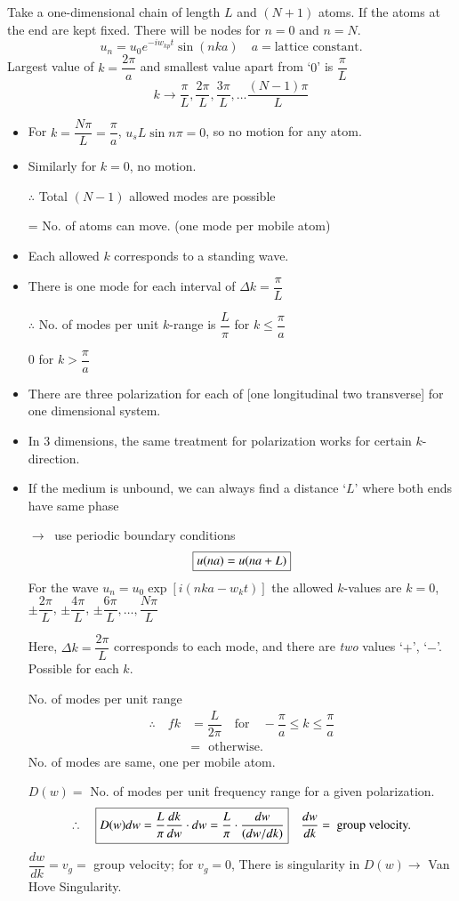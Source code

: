 Take a one-dimensional chain of length $L$ and $(N+1)$ atoms. If the atoms at the end are kept fixed. There will be nodes for $n=0$ and $n=N$.
$$
u_{n}=u_{0}e^{-iw_{kp}t}\sin (nka)\quad a= \text{lattice constant.}
$$
Largest value of $k=\dfrac{2\pi}{a}$ and smallest value apart from `$0$' is $\dfrac{\pi}{L}$
$$
k\to \dfrac{\pi}{L}, \dfrac{2\pi}{L}, \dfrac{3\pi}{L},\ldots \dfrac{(N-1)\pi}{L}
$$
\begin{itemize}
\item For $k=\dfrac{N\pi}{L}=\dfrac{\pi}{a}$, $u_{s}L\sin n\pi=0$, so no motion for any atom.

\item Similarly for $k=0$, no motion.

$\therefore$ Total $(N-1)$ allowed modes are possible

= No. of atoms can move. (one mode per mobile atom)

\item Each allowed $k$ corresponds to a standing wave.

\item There is one mode for each interval of $\Delta k=\dfrac{\pi}{L}$

$\therefore$ No. of modes per unit $k$-range is $\dfrac{L}{\pi}$ for $k\leq \dfrac{\pi}{a}$

$0$ for $k>\dfrac{\pi}{a}$

\item There are three polarization for each of [one longitudinal two transverse] for one dimensional system.

\item In 3 dimensions, the same treatment for polarization works for certain $k$-direction.

\item If the medium is unbound, we can always find a distance `$L$' where both ends have same phase 

$\to \ $ use periodic boundary conditions
$$
\fbox{$u(na)=u(na+L)$}
$$
For the wave $u_{n}=u_{0}\exp [i(nka-w_{k}t)]$ the allowed $k$-values are $k=0$, $\pm\dfrac{2\pi}{L}$, $\pm \dfrac{4\pi}{L}$, $\pm \dfrac{6\pi}{L},\ldots,\dfrac{N\pi}{L}$

Here, $\Delta k=\dfrac{2\pi}{L}$ corresponds to each mode, and there are {\em two} values `$+$', `$-$'. Possible for each $k$.

No. of modes per unit range
\begin{align*}
\therefore\quad fk &= \dfrac{L}{2\pi}\quad\text{for}\quad -\dfrac{\pi}{a}\leq k\leq \dfrac{\pi}{a}\\
&= \text{~ otherwise.}
\end{align*}
No. of modes are same, one per mobile atom.

$D(w)=$ No. of modes per unit frequency range for a given polarization.
$$
\therefore\quad \fbox{$D(w)dw=\dfrac{L}{\pi}\dfrac{dk}{dw}\cdot dw=\dfrac{L}{\pi}\cdot \dfrac{dw}{(dw/dk)}$}\quad \dfrac{dw}{dk}=\text{ group velocity.}
$$
$\dfrac{dw}{dk}=v_{g}=$ group velocity; for $v_{g}=0$, There is singularity in $D(w)\to$ Van Hove Singularity.
\end{itemize}

